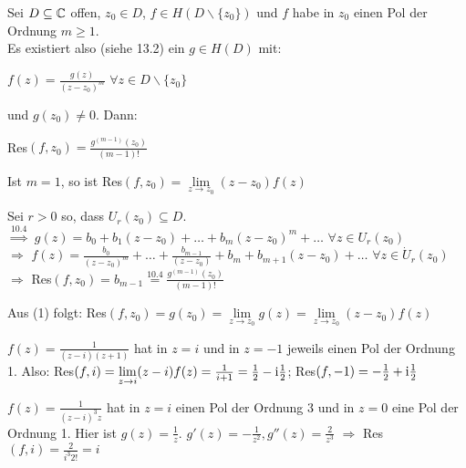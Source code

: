 \documentclass[a4paper,twoside,DIV15,BCOR12mm]{scrbook}
\def\ie{\rm i}
\begin{document}
\begin{satz}
  Sei $D \subseteq \mathbb{C}$ offen, $z_0 \in D$, $f \in H(D \backslash \{z_0\})$ und
  $f$ habe in $z_0$ einen Pol der Ordnung $m \geq 1$. \\
  Es existiert also (siehe 13.2) ein $g \in H(D)$ mit: \\
  \centerline{$f(z) = \frac{g(z)}{(z-z_0)^m }$ $\forall z \in D \backslash \{z_0\}$} und
  $g(z_0) \neq 0.$ Dann: \\
  \begin{liste}
    \item Res$(f,z_0) = \frac{g^{(m-1)}(z_0)}{(m-1)!}$
    \item Ist $m=1$, so ist Res$(f, z_0) = \lim\limits_{z \to z_0} (z-z_0) f(z)$
  \end{liste}
\end{satz}
\begin{beweis}
  \begin{liste}
    \item Sei $r > 0$ so, dass $U_r(z_0) \subseteq D$. \\ 
    $\stackrel{10.4}{\Rightarrow}$ $g(z) = b_0 + b_1(z-z_0) + \ldots + b_m(z-z_0)^m
    + \ldots$ $\forall z \in U_r(z_0)$ \\
    $\Rightarrow$ $f(z) = \frac{b_0}{(z-z_0)^m} + \ldots + \frac{b_{m-1}}{(z-z_0)} + b_m +
    b_{m+1}(z-z_0) + \ldots$ $\forall z \in \dot{U}_r(z_0)$ $\Rightarrow$ Res$(f, z_0) =
    b_{m-1} \stackrel{\text{10.4}}{=} \frac{g^{(m-1)}(z_0)}{(m-1)!}$
    \item Aus (1) folgt: Res$(f, z_0) = g(z_0) = \lim\limits_{z\to z_0} g(z) =
    \lim\limits_{z\to z_0} (z-z_0) f(z)$
  \end{liste}
\end{beweis}
\begin{beispiel}
  \begin{liste}
    \item 
    $f(z) = \frac{1}{(z-i)(z+1)}$ hat in $z = i$ und in $z = -1$ jeweils einen
    Pol der Ordnung 1. Also: Res$(f, i) = \lim\limits_{z\to i} (z-i) f(z) =
    \frac{1}{i+1} = \frac{1}{2}- \ie \frac{1}{2}$; Res$(f, -1) = -\frac{1}{2}+ \ie
    \frac{1}{2}$ 
    \item $f(z) = \frac{1}{(z-i)^3 z}$ hat in $z = i$ einen Pol der Ordnung 3 und in
    $z = 0$ eine Pol der Ordnung 1. Hier ist $g(z) = \frac{1}{z}.$ $g'(z) = -
     \frac{1}{z^2}, g''(z) = \frac{2}{z^3}$ $\Rightarrow$ Res$(f,i) = \frac{2}{i^3
    2!} = i$
  \end{liste}
\end{beispiel}
\end{document}

